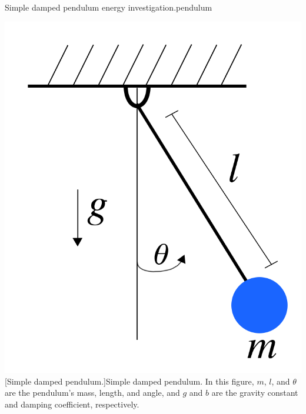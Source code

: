 \begin{example}{Simple damped pendulum energy investigation.}{pendulum}
  \begin{center}
    \captionsetup{type=figure}
    \includegraphics[width=0.3\linewidth]{figures/figure-pendulum.png}
    [Simple damped pendulum.]{Simple damped pendulum. In this figure, $m$, $l$, and $\theta$ are the pendulum's mass, length, and angle, and $g$ and $b$ are the gravity constant and damping coefficient, respectively.} \label{fig:pendulum}
  \end{center}


\end{example}
